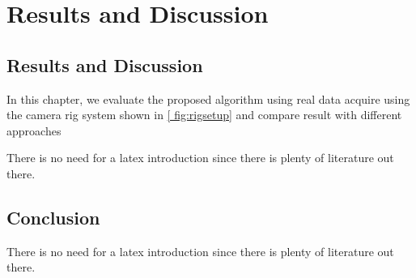 \chapter{Results and Discussion}
\label{chapter:Results and Discussion}



 
\section{Results and Discussion}
In this chapter, we evaluate the proposed algorithm using real data acquire using 
the camera rig system shown in \ref{ fig:rigsetup} and compare result with different 
approaches 



There is no need for a latex introduction since there is plenty of literature out there.
 

\section{Conclusion}
There is no need for a latex introduction since there is plenty of literature out there.


